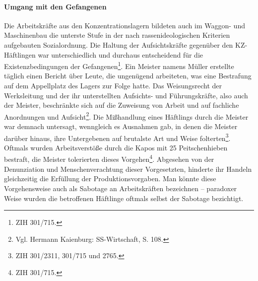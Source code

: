 \paragraph{Umgang mit den Gefangenen}
Die Arbeitskräfte aus den Konzentrationslagern bildeten auch im Waggon- und Maschinenbau die unterste Stufe in der nach rassenideologischen Kriterien aufgebauten Sozialordnung.
Die Haltung der Aufsichtskräfte gegenüber den KZ-Häftlingen war unterschiedlich und durchaus entscheidend für die Existenzbedingungen der Gefangenen\footnote{ZIH 301/715.}. Ein Meister namens Müller erstellte täglich einen Bericht über Leute, die ungenügend arbeiteten, was eine Bestrafung auf dem Appellplatz des Lagers zur Folge hatte. Das Weisungsrecht der Werksleitung und der ihr unterstellten Aufsichts- und Führungskräfte, also auch der Meister, beschränkte sich auf die Zuweisung von Arbeit und auf fachliche Anordnungen und Aufsicht\footnote{Vgl. Hermann Kaienburg: SS-Wirtschaft, S. 108.}. Die Mißhandlung eines Häftlings durch die Meister war demnach untersagt, wenngleich es Ausnahmen gab, in denen die Meister darüber hinaus, ihre Untergebenen auf brutalste Art und Weise folterten\footnote{ZIH 301/2311, 301/715 und 2765.}. Oftmals wurden Arbeitsverstöße durch die Kapos mit 25 Peitschenhieben bestraft, die Meister tolerierten dieses Vorgehen\footnote{ZIH 301/715.}. Abgesehen von der Denunziation und Menschenverachtung dieser Vorgesetzten, hinderte ihr Handeln gleichzeitig die Erfüllung der Produktionsvorgaben. Man könnte diese Vorgehensweise auch als Sabotage an Arbeitskräften bezeichnen -- paradoxer Weise wurden die betroffenen Häftlinge oftmals selbst der Sabotage bezichtigt.
